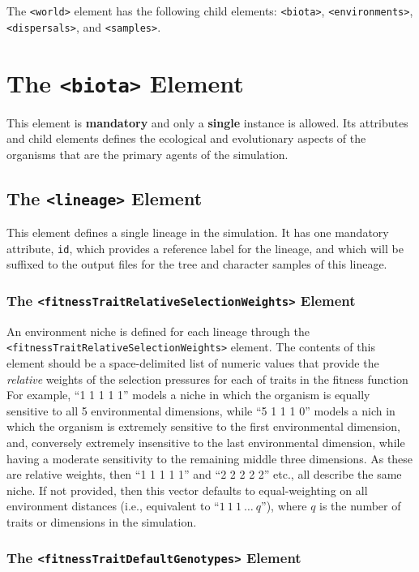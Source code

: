 \documentclass[11pt]{article}
\newcommand{\xmlelem}[1]{{\tt<\textcolor{xmlelem}{#1}>}}
\newcommand{\xmlattr}[1]{{\tt\textcolor{xmlattr}{#1}}}
\begin{document}
The \xmlelem{world} element has the following child elements: \xmlelem{biota}, \xmlelem{environments}, \xmlelem{dispersals}, and \xmlelem{samples}.


\section{The \xmlelem{biota} Element}

This element is \textbf{mandatory} and only a \textbf{single} instance is allowed.
Its attributes and child elements defines the ecological and evolutionary aspects of the organisms that are the primary agents of the simulation.

\subsection{The \xmlelem{lineage} Element}
This element defines a single lineage in the simulation. It has one mandatory attribute, \xmlattr{id}, which provides a reference label for the lineage, and which will be suffixed to the output files for the tree and character samples of this lineage.


\subsubsection{The \xmlelem{fitnessTraitRelativeSelectionWeights} Element}

An environment niche is defined for each lineage through the \xmlelem{fitnessTraitRelativeSelectionWeights} element.
The contents of this element should be a space-delimited list of numeric values that provide the \textit{relative} weights of the selection pressures for each of traits in the fitness function
For example, ``1 1 1 1 1'' models a niche in which the organism is equally sensitive to all 5 environmental dimensions, while ``5 1 1 1 0'' models a nich in which the organism is extremely sensitive to the first environmental dimension, and, conversely extremely insensitive to the last environmental dimension, while having a moderate sensitivity to the remaining middle three dimensions.
As these are relative weights, then ``1 1 1 1 1'' and ``2 2 2 2 2'' etc., all describe the same niche.
If not provided, then this vector defaults to equal-weighting on all environment distances (i.e., equivalent to ``$1 \ 1 \ 1 \ \dots \ q$''), where $q$ is the number of traits or dimensions in the simulation.

\subsubsection{The \xmlelem{fitnessTraitDefaultGenotypes} Element}
\end{document}
